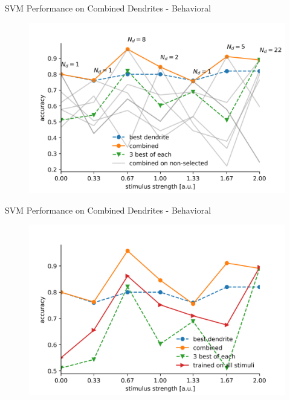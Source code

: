 \documentclass[10pt]{beamer}
\begin{document}
\begin{frame}[fragile]{SVM Performance on Combined Dendrites - Behavioral}
\begin{center}
	\begin{figure}
      \includegraphics[width=1.0\textwidth]{combined_hitmiss.png}
	\end{figure}
	\end{center}
\end{frame}

\begin{frame}[fragile]{SVM Performance on Combined Dendrites - Behavioral}
\begin{center}
	\begin{figure}
      \includegraphics[width=1.0\textwidth]{combined_hitmiss_alt.png}
	\end{figure}
	\end{center}
\end{frame}
\end{document}
